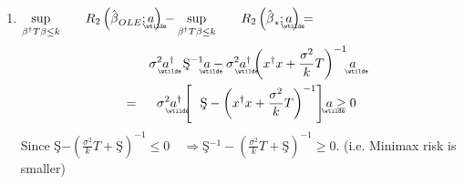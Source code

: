 \documentclass{article}
\begin{document}
\bigskip

\begin{enumerate}
\item $\underset{\beta ^{\dagger }T\beta \leq k}{\sup }\qquad R_{2}\left( 
\hat{\beta}_{OLE};%
\underaccent{\wtilde}{a}%
\right) -\underset{\beta ^{\dagger }T\beta \leq k}{\sup }\qquad R_{2}\left( 
\hat{\beta}_{\ast };%
\underaccent{\wtilde}{a}%
\right) =$%
\begin{eqnarray*}
&&\sigma ^{2}%
\underaccent{\wtilde}{a}%
^{\dagger }\text{\c{S}}^{-1}%
\underaccent{\wtilde}{a}%
-\sigma ^{2}%
\underaccent{\wtilde}{a}%
^{\dagger }\left( x^{\dagger }x+\frac{\sigma ^{2}}{k}T\right) ^{-1}%
\underaccent{\wtilde}{a}
\\
&=&\sigma ^{2}%
\underaccent{\wtilde}{a}%
^{\dagger }\left[ \text{\c{S}}-\left( x^{\dagger }x+\frac{\sigma ^{2}}{k}%
T\right) ^{-1}\right] 
\underaccent{\wtilde}{a}%
\geq 0
\end{eqnarray*}%
Since \c{S}$-\left( \frac{\sigma ^{2}}{k}T+\text{\c{S}}\right) ^{-1}\leq
0\quad \Rightarrow $\c{S}$^{-1}-\left( \frac{\sigma ^{2}}{k}T+\text{\c{S}}%
\right) ^{-1}\geq 0$. (i.e. Minimax risk is smaller)


\end{enumerate}
\end{document}
